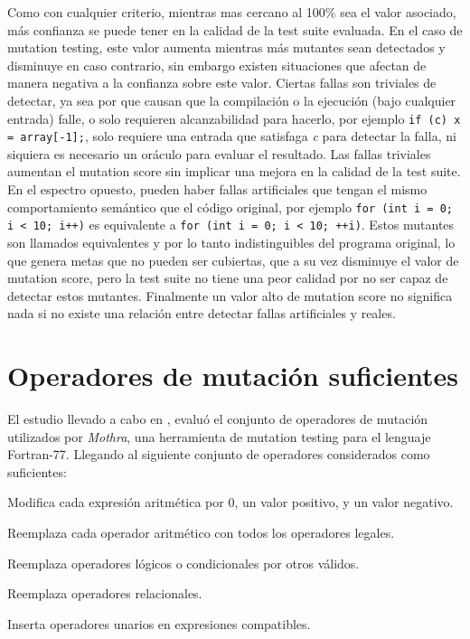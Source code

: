 Como con cualquier criterio, mientras mas cercano al 100\% sea el valor asociado, m\'as confianza se puede tener en la calidad de la test suite evaluada. En el caso de mutation testing, este valor aumenta mientras m\'as mutantes sean detectados y disminuye en caso contrario, sin embargo existen situaciones que afectan de manera negativa a la confianza sobre este valor. Ciertas fallas son triviales de detectar, ya sea por que causan que la compilaci\'on o la ejecuci\'on (bajo cualquier entrada) falle, o solo requieren alcanzabilidad para hacerlo, por ejemplo \lstinline|if (c) x = array[-1];|, solo requiere una entrada que satisfaga \emph{c} para detectar la falla, ni siquiera es necesario un or\'aculo para evaluar el resultado. Las fallas triviales aumentan el mutation score sin implicar una mejora en la calidad de la test suite. En el espectro opuesto, pueden haber fallas artificiales que tengan el mismo comportamiento sem\'antico que el c\'odigo original, por ejemplo \lstinline|for (int i = 0; i < 10; i++)| es equivalente a \lstinline|for (int i = 0; i < 10; ++i)|. Estos mutantes son llamados equivalentes y por lo tanto indistinguibles del programa original, lo que genera metas que no pueden ser cubiertas, que a su vez disminuye el valor de mutation score, pero la test suite no tiene una peor calidad por no ser capaz de detectar estos mutantes. Finalmente un valor alto de mutation score no significa nada si no existe una relaci\'on entre detectar fallas artificiales y reales.

\section{Operadores de mutaci\'on suficientes}
\label{sec:preliminares.mutation.sufficient}

El estudio llevado a cabo en \cite{bibliography.mutation.selection.Offutt96}, evalu\'o el conjunto de operadores de mutaci\'on utilizados por \emph{Mothra}, una herramienta de mutation testing para el lenguaje Fortran-77. Llegando al siguiente conjunto de operadores considerados como suficientes:

\begin{description}[leftmargin=8em,style=nextline]
	\item[ABS] Modifica cada expresi\'on aritm\'etica por 0, un valor positivo, y un valor negativo.
	\item[AOR] Reemplaza cada operador aritm\'etico con todos los operadores legales.
	\item[LCR] Reemplaza operadores l\'ogicos o condicionales por otros v\'alidos.
	\item[ROR] Reemplaza operadores relacionales.
	\item[UOI] Inserta operadores unarios en expresiones compatibles.
\end{description}

